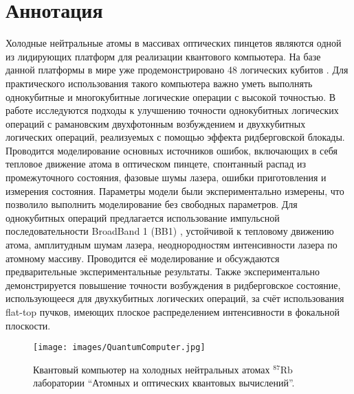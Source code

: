 \section*{Аннотация}

Холодные нейтральные атомы в массивах оптических пинцетов являются одной из лидирующих платформ для реализации квантового компьютера. На базе данной платформы в мире уже продемонстрировано 48 логических кубитов \cite{Bluvstein:2024aa}. Для практического использования такого компьютера важно уметь выполнять однокубитные и многокубитные логические операции с высокой точностью. В работе исследуются подходы к улучшению точности однокубитных логических операций с рамановским двухфотонным возбуждением и двухкубитных логических операций, реализуемых с помощью эффекта ридберговской блокады. Проводится моделирование основных источников ошибок, включающих в себя тепловое движение атома в оптическом пинцете, спонтанный распад из промежуточного состояния, фазовые шумы лазера, ошибки приготовления и измерения состояния. Параметры модели были экспериментально измерены, что позволило выполнить моделирование без свободных параметров. Для однокубитных операций предлагается использование импульсной последовательности BroadBand 1 (BB1) \cite{WIMPERIS199046,WIMPERIS1989509,Wimperis1994BroadbandNA}, устойчивой к тепловому движению атома, амплитудным шумам лазера, неоднородностям интенсивности лазера по атомному массиву. Проводится её моделирование и обсуждаются предварительные экспериментальные результаты. Также экспериментально демонстрируется повышение точности возбуждения в ридберговское состояние, использующееся для двухкубитных логических операций, за счёт использования flat-top пучков, имеющих плоское распределением интенсивности в фокальной плоскости. 

\begin{figure}[ht]
	\centering
	\texttt{[image: images/QuantumComputer.jpg]}
	\caption{Квантовый компьютер на холодных нейтральных атомах $^{87}\text{Rb}$ лаборатории ``Атомных и оптических квантовых вычислений''.}
\end{figure}

\newpage